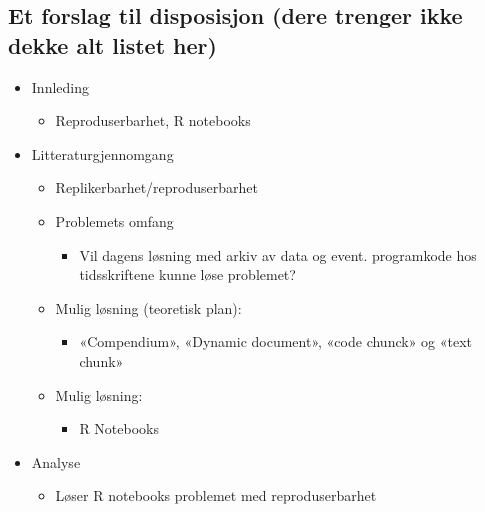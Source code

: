 \documentclass[
  12pt,
  norsk,
]{article}
\providecommand{\tightlist}{%
  \setlength{\itemsep}{0pt}\setlength{\parskip}{0pt}}
\begin{document}
\hypertarget{et-forslag-til-disposisjon-dere-trenger-ikke-dekke-alt-listet-her}{%
\subsection{Et forslag til disposisjon (dere trenger ikke dekke alt
listet
her)}\label{et-forslag-til-disposisjon-dere-trenger-ikke-dekke-alt-listet-her}}

\begin{itemize}
\tightlist
\item
  Innleding

  \begin{itemize}
  \tightlist
  \item
    Reproduserbarhet, R notebooks
  \end{itemize}
\item
  Litteraturgjennomgang

  \begin{itemize}
  \tightlist
  \item
    Replikerbarhet/reproduserbarhet
  \item
    Problemets omfang

    \begin{itemize}
    \tightlist
    \item
      Vil dagens løsning med arkiv av data og event. programkode hos
      tidsskriftene kunne løse problemet?
    \end{itemize}
  \item
    Mulig løsning (teoretisk plan):

    \begin{itemize}
    \tightlist
    \item
      «Compendium», «Dynamic document», «code chunck» og «text chunk»
    \end{itemize}
  \item
    Mulig løsning:

    \begin{itemize}
    \tightlist
    \item
      R Notebooks
    \end{itemize}
  \end{itemize}
\item
  Analyse

  \begin{itemize}
  \tightlist
  \item
    Løser R notebooks problemet med reproduserbarhet


\end{itemize}
\end{itemize}
\end{document}
